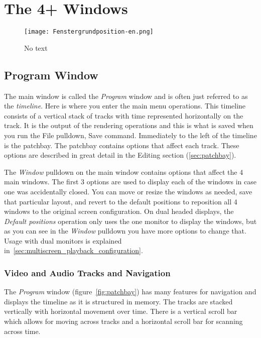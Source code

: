\chapter{The 4+ Windows}%
\label{cha:the_4_windows}

\begin{figure}[htpb]
    \centering
    \texttt{[image: Fenstergrundposition-en.png]}
    \captionsetup{labelformat=empty, textformat=empty}
    \caption[The four windows (cc-by-sa Olaf)]{No text}    
    \label{fig:Fenstergrundposition-en}
\end{figure}

\section{Program Window}%
\label{sec:program_window}

The main window is called the \textit{Program} window and is often just referred to as the \textit{timeline}.  Here is where you enter the main menu operations.  
This timeline consists of a vertical stack of tracks with time represented horizontally on the track. 
It is the output of the rendering operations and this is what is saved when you run the File pulldown, Save command.
Immediately to the left of the timeline is the patchbay. The patchbay contains options that affect each track.  
These options are described in great detail in the Editing section (\ref{sec:patchbay}).

The \textit{Window} pulldown on the main window contains options
that affect the 4 main windows. The first 3 options are used to
display each of the windows in case one was accidentally closed.
You can move or resize the windows as needed, save that particular
layout, and revert to the default positions to reposition all 4
windows to the original screen configuration.  On dual headed
displays, the \textit{Default positions} operation only uses the one
monitor to display the windows, but as you can see in the
\textit{Window} pulldown you have more options to change that. Usage
with dual monitors is explained
in~\ref{sec:multiscreen_playback_configuration}.

\subsection{Video and Audio Tracks and Navigation}%
\label{sub:video_and_audio_tracks_and_navigation}

The \textit{Program} window (figure~\ref{fig:patchbay}) has many features for navigation and displays the timeline as it is structured in memory. The tracks are stacked vertically with horizontal movement over time.
There is a vertical scroll bar which allows for moving across tracks and a horizontal scroll bar for scanning across time. 

